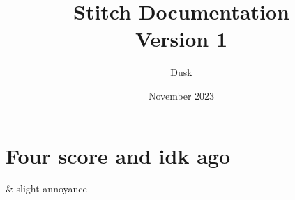 \documentclass{report}
\title{Stitch Documentation \\ \large Version 1}
\author{Dusk}
\date{November 2023}
\begin{document}
\maketitle

\section{Four score and idk ago}
& slight annoyance
\end{document}
